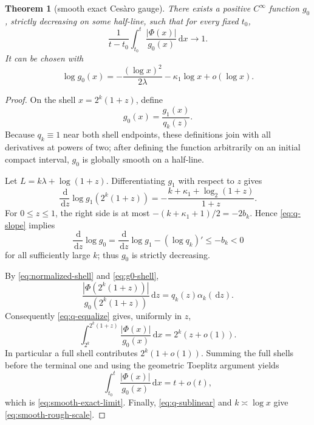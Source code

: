 \documentclass[11pt,oneside]{article}
\newtheorem{theorem}{Theorem}[section]
\theoremstyle{definition}
\theoremstyle{remark}
\newcommand{\dd}{\,\mathrm d}
\begin{document}
\begin{theorem}[smooth exact Ces\`aro gauge]
\label{thm:smooth-exact}
There exists a positive \(C^\infty\) function \(g_0\), strictly decreasing on
some half-line, such that for every fixed \(t_0\),
\begin{equation}
 \frac1{t-t_0}\int_{t_0}^t\frac{|\Phi(x)|}{g_0(x)}\dd x
 \longrightarrow1.
 \label{eq:smooth-exact-limit}
\end{equation}
It can be chosen with
\begin{equation}
 \log g_0(x)
 =-\frac{(\log x)^2}{2\lambda}-\kappa_1\log x+o(\log x).
 \label{eq:smooth-rough-scale}
\end{equation}
\end{theorem}

\begin{proof}
On the shell \(x=2^k(1+z)\), define
\begin{equation}
 g_0(x)=\frac{g_1(x)}{q_k(z)}.
 \label{eq:g0-shell}
\end{equation}
Because \(q_k\equiv1\) near both shell endpoints, these definitions join with
all derivatives at powers of two; after defining the function arbitrarily on
an initial compact interval, \(g_0\) is globally smooth on a half-line.

Let \(L=k\lambda+\log(1+z)\).  Differentiating \(g_1\) with respect to
\(z\) gives
\begin{equation}
 \frac{\dd}{\dd z}\log g_1(2^k(1+z))
 =-\frac{k+\kappa_1+\log_2(1+z)}{1+z}.
 \label{eq:g1-z-derivative}
\end{equation}
For \(0\le z\le1\), the right side is at most
\(-(k+\kappa_1+1)/2=-2b_k\).  Hence \eqref{eq:q-slope} implies
\[
 \frac{\dd}{\dd z}\log g_0
 =\frac{\dd}{\dd z}\log g_1-(\log q_k)'
 \le -b_k<0
\]
for all sufficiently large \(k\); thus \(g_0\) is strictly decreasing.

By \eqref{eq:normalized-shell} and \eqref{eq:g0-shell},
\[
 \frac{|\Phi(2^k(1+z))|}{g_0(2^k(1+z))}\dd z
 =q_k(z)\alpha_k(\dd z).
\]
Consequently \eqref{eq:q-equalize} gives, uniformly in \(z\),
\begin{equation}
 \int_{2^k}^{2^k(1+z)}\frac{|\Phi(x)|}{g_0(x)}\dd x
 =2^k(z+o(1)).
 \label{eq:equalized-partial-shell}
\end{equation}
In particular a full shell contributes \(2^k(1+o(1))\).  Summing the full
shells before the terminal one and using the geometric Toeplitz argument yields
\[
 \int_{t_0}^{t}\frac{|\Phi(x)|}{g_0(x)}\dd x=t+o(t),
\]
which is \eqref{eq:smooth-exact-limit}.  Finally,
\eqref{eq:q-sublinear} and \(k\asymp\log x\) give
\eqref{eq:smooth-rough-scale}.
\end{proof}
\end{document}
